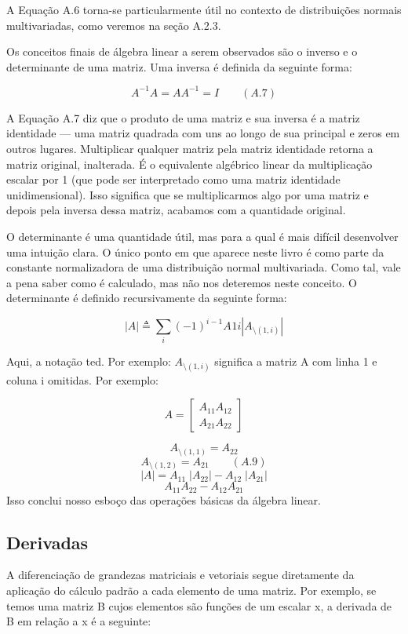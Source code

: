 \documentclass[
  12pt,
]{book}
\begin{document}
A Equação A.6 torna-se particularmente útil no contexto de distribuições normais multivariadas, como veremos na seção A.2.3.

Os conceitos finais de álgebra linear a serem observados são o inverso e o determinante de uma matriz. Uma inversa é definida da seguinte forma:

\[ A^{-1}A = AA^{-1} = I \qquad (A.7)\]

A Equação A.7 diz que o produto de uma matriz e sua inversa é a matriz identidade --- uma matriz quadrada com uns ao longo de sua principal e zeros em outros lugares. Multiplicar qualquer matriz pela matriz identidade retorna a matriz original, inalterada. É o equivalente algébrico linear da multiplicação escalar por 1 (que pode ser interpretado como uma matriz identidade unidimensional). Isso significa que se multiplicarmos algo por uma matriz e depois pela inversa dessa matriz, acabamos com a quantidade original.

O determinante é uma quantidade útil, mas para a qual é mais difícil desenvolver uma intuição clara. O único ponto em que aparece neste livro é como parte da constante normalizadora de uma distribuição normal multivariada. Como tal, vale a pena saber como é calculado, mas não nos deteremos neste conceito. O determinante é definido recursivamente da seguinte forma:

\[ |A| \triangleq \sum_i(-1)^{i-1}A_{}1i | A_{\setminus(1,i)} |  \]

Aqui, a notação ted. Por exemplo:
\(A_{\setminus(1, i)}\) significa a matriz A com linha 1 e coluna i omitidas. Por exemplo:

\[ A = 
\begin{bmatrix} 
  A_{11} A_{12} \\ 
  A_{21} A_{22} 
  \end{bmatrix}
  \]

\[ A_{\setminus(1,1)} = A_{22}\]
\[ A_{\setminus(1,2)} = A_{21} \qquad (A.9)\]
\[ |A| = A_{11} \; |A_{22}| -  A_{12} \;| A_{21}|\]
\[  A_{11}A_{22} - A_{12}A_{21} \]
Isso conclui nosso esboço das operações básicas da álgebra linear.

\hypertarget{derivadas}{%
\subsection{Derivadas}\label{derivadas}}

A diferenciação de grandezas matriciais e vetoriais segue diretamente da aplicação do cálculo padrão a cada elemento de uma matriz. Por exemplo, se temos uma matriz B cujos elementos são funções de um escalar x, a derivada de B em relação a x é a seguinte:
\end{document}
